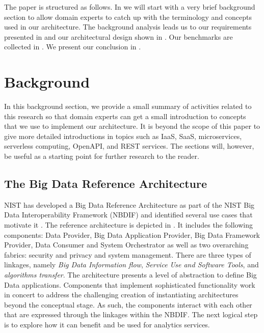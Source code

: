 The paper is structured as follows. In  we will start with a very brief background section to allow domain experts to catch up with the terminology and concepts used in our architecture. The background analysis leads us to our requirements presented in  and our architectural design shown in . Our benchmarks are collected in . We present our conclusion in .

\section{Background}
\label{sec:background}

In this background section, we provide a small summary of activities related to this research so that domain experts can get a small introduction to concepts that we use to implement our architecture. It is beyond the scope of this paper to give more detailed introductions in topics such as IaaS, SaaS, microservices, serverless computing, OpenAPI, and REST services. The sections will, however, be useful as a starting point for further research to the reader. 

\subsection{The Big Data Reference Architecture}

NIST has developed a Big Data Reference Architecture as part of the NIST Big Data Interoperability Framework (NBDIF)\cite{nist-v6} and identified several use cases that motivate
it \cite{nist-v3}. The reference architecture is depicted in . It includes the following components: Data Provider, Big Data Application Provider, Big Data Framework Provider, Data Consumer and
System Orchestrator as well as two overarching fabrics: security and
privacy and system management. There are three types of linkages,
namely \emph{Big Data Information flow}, \emph{Service Use and
  Software Tools}, and \emph{algorithms transfer}. The architecture
presents a level of abstraction to define Big Data
applications. Components that implement sophisticated functionality
work in concert to address the challenging creation of instantiating architectures beyond the conceptual stage. As such, the components
interact with each other that are expressed through the linkages
within the NBDIF.  The next logical step is to explore how it can
benefit and be used for analytics services.

